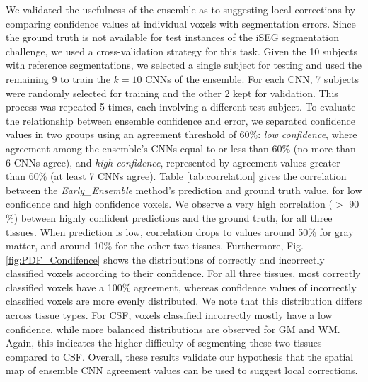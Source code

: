 \documentclass[twoside,espcrc2]{elsarticle}
\begin{document}

We validated the usefulness of the ensemble as to suggesting local corrections by comparing confidence values at individual voxels with segmentation errors. Since the ground truth is not available for test instances of the iSEG segmentation challenge, we used a cross-validation strategy for this task. Given the 10 subjects with reference segmentations, we selected a single subject for testing and used the remaining 9 to train the $k=10$ CNNs of the ensemble. For each CNN, 7 subjects were randomly selected for training and the other 2 kept for validation. This process was repeated 5 times, each involving a different test subject. To evaluate the relationship between ensemble confidence and error, we separated confidence values in two groups using an agreement threshold of 60\%:  \emph{low confidence}, where agreement among the ensemble's CNNs equal to or less than 60$\%$ (no more than 6 CNNs agree), and \emph{high confidence}, represented by agreement values greater than 60$\%$ (at least 7 CNNs agree).
Table \ref{tab:correlation} gives the correlation between the \textit{Early\_Ensemble} method's prediction and ground truth value, for low confidence and high confidence voxels. We observe a very high correlation ($>$ 90$\%$) between highly confident predictions and the ground truth, for all three tissues. When prediction is low, correlation drops to values around 50$\%$ for gray matter, and around 10$\%$ for the other two tissues. Furthermore, Fig. \ref{fig:PDF_Condifence} shows the distributions of correctly and incorrectly classified voxels according to their confidence. For all three tissues, most correctly classified voxels have a 100$\%$ agreement, whereas confidence values of incorrectly classified voxels are more evenly distributed. We note that this distribution differs across tissue types. For CSF, voxels classified incorrectly mostly have a low confidence, while more balanced distributions are observed for GM and WM. Again, this indicates the higher difficulty of segmenting these two tissues compared to CSF. Overall, these results validate our hypothesis that the spatial map of ensemble CNN agreement values can be used to suggest local corrections. 
\end{document}
